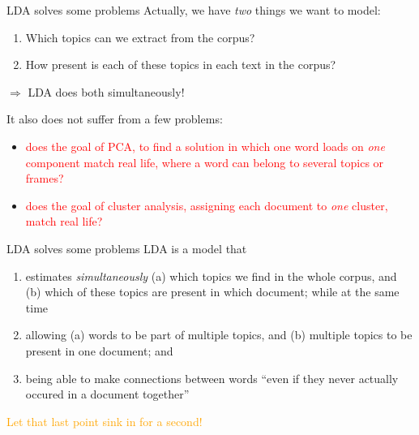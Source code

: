 \begin{frame}[fragile]{LDA solves some problems}
Actually, we have \emph{two} things we want to model:

\begin{enumerate}
	\item Which topics can we extract from the corpus?
	\item How present is each of these topics in each text in the corpus?
\end{enumerate}
$\Rightarrow$ LDA does both simultaneously!

It also does not suffer from a few problems:
\begin{itemize}
\item  \textcolor{red}{does the goal of PCA, to find a solution in which one word loads on \emph{one} component match real life, where a word can belong to several topics or frames?}
\item \textcolor{red}{does the goal of cluster analysis, assigning each document to \emph{one} cluster, match real life?}
\end{itemize}

\end{frame}


\begin{frame}{LDA solves some problems}
LDA is a model that 
\begin{enumerate}[<+->]
	\item estimates \emph{simultaneously} (a) which topics we find in the whole corpus, and (b) which of these topics are present in which document; while at the same time
	\item allowing (a) words to be part of multiple topics, and (b) multiple topics to be present in one document; and
	\item being able to make connections between words ``even if they never actually occured in a document together'' \parencite[p.~96]{Maier2018a}
\end{enumerate}
\pause
\textcolor{orange}{Let that last point sink in for a second!}
\end{frame}




